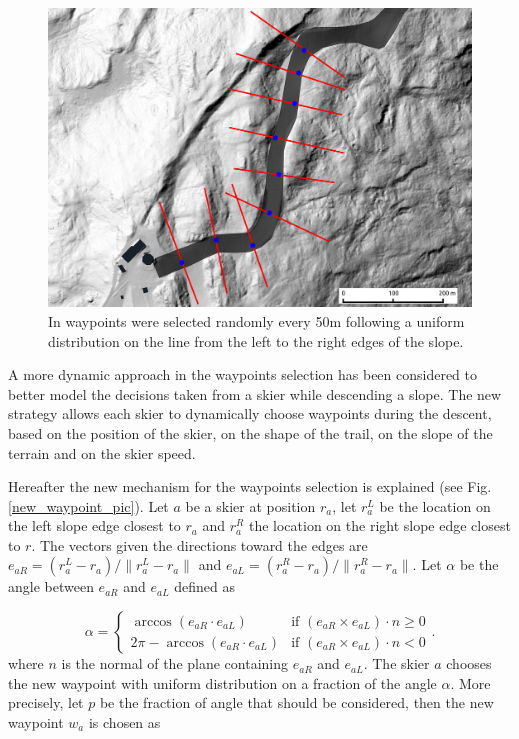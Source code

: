 \documentclass[12pt,a4paper,twoside]{book}
\newcommand{\norm}[1]{\lVert#1\rVert}
\begin{document}
\begin{figure}
  \begin{center}
    \includegraphics[width=\textwidth]{images/waypoint_line.eps}
    \caption{In \cite{hol2012} waypoints were selected randomly every 50m following a uniform distribution on the line from the left to the right edges of the slope.}\label{waypoints_old_pic}
  \end{center}
\end{figure}

A more dynamic approach in the waypoints selection has been considered to better model the decisions taken from a skier while descending a slope. The new strategy allows each skier to dynamically choose waypoints during the descent, based on the position of the skier, on the shape of the trail, on the slope of the terrain and on the skier speed.

Hereafter the new mechanism for the waypoints selection is explained (see Fig.\ref{new_waypoint_pic}). Let $a$ be a skier at position $r_a$, let $r_a^L$ be the location on the left slope edge closest to $r_a$ and $r_a^R$ the location on the right slope edge closest to $r$. The vectors given the directions toward the edges are $e_{aR}=\left(r_a^L-r_a\right)/\norm{r_a^L-r_a}$ and $e_{aL}=\left(r_a^R-r_a\right)/\norm{r_a^R-r_a}$. Let $\alpha$ be the angle between $e_{aR}$ and $e_{aL}$ defined as

\begin{equation}
\alpha=\begin{cases}
  \arccos(e_{aR} \cdot e_{aL}) & \text{if } (e_{aR} \times e_{aL})\cdot n \ge 0 \\
  2\pi-\arccos(e_{aR} \cdot e_{aL}) & \text {if } (e_{aR} \times e_{aL})\cdot n < 0
\end{cases}.
\end{equation}
where $n$ is the normal of the plane containing $e_{aR}$ and $e_{aL}$. The skier $a$ chooses the new waypoint with uniform distribution on a fraction of the angle $\alpha$. More precisely, let $p$ be the fraction of angle that should be considered, then the new waypoint $w_a$ is chosen as
\end{document}

